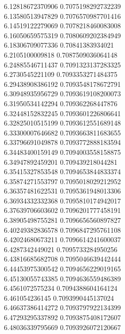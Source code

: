 {6.12818672370906 0.7075198292732239 \\
6.13580513947829 0.7076570987701416 \\
6.14519122279069 0.7078218460083008 \\
6.16050659575319 0.7080609202384949 \\
6.18306709077336 0.70841383934021 \\
6.2105100009818 0.7087509036064148 \\
6.24885546711437 0.7091323137283325 \\
6.2730545221109 0.7093353271484375 \\
6.29438908386192 0.7093548178672791 \\
6.30948935956729 0.7093619108200073 \\
6.31950534142294 0.709362268447876 \\
6.32448152832245 0.7093601226806641 \\
6.32825010515199 0.7093612551689148 \\
6.33300007646682 0.7093663811683655 \\
6.33796691049878 0.7093772888183594 \\
6.34483400159149 0.7094003558158875 \\
6.34947892459201 0.709439218044281 \\
6.35415327853548 0.7094653844833374 \\
6.35874271553797 0.7095018029212952 \\
6.36357481622531 0.7095361948013306 \\
6.36934332332368 0.7095810174942017 \\
6.37639706603602 0.7096201777458191 \\
6.38905498755281 0.7096656560897827 \\
6.40249382836578 0.7096847295761108 \\
6.42024680673211 0.7096614241600037 \\
6.4287342449021 0.7095733284950256 \\
6.43816685682708 0.7095046639442444 \\
6.44453975300542 0.7094656229019165 \\
6.45130055743385 0.7094636559486389 \\
6.4561072575234 0.7094388604164124 \\
6.461054236145 0.7093990445137024 \\
6.46637386414272 0.7093797922134399 \\
6.47293295337892 0.7093875408172607 \\
6.48036339795669 0.7093926072120667 \\
}
